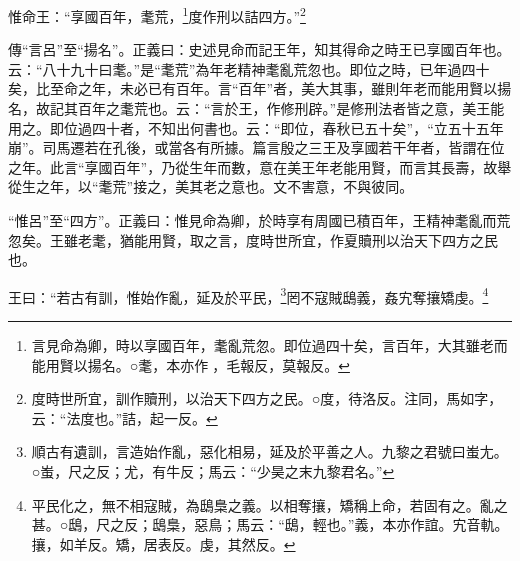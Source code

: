 惟命王：“享國百年，耄荒，\footnote{言見命為卿，時以享國百年，耄亂荒忽。即位過四十矣，言百年，大其雖老而能用賢以揚名。○耄，本亦作𦿗，毛報反，莫報反。}度作刑以詰四方。”\footnote{度時世所宜，訓作贖刑，以治天下四方之民。○度，待洛反。注同，馬如字，云：“法度也。”詰，起一反。}


{\noindent\zhuan{}\fzbyks 傳“言呂”至“揚名”。正義曰：史述見命而記王年，知其得命之時王已享國百年也。云：“八十九十曰耄。”是“耄荒”為年老精神耄亂荒忽也。即位之時，已年過四十矣，比至命之年，未必已有百年。言“百年”者，美大其事，雖則年老而能用賢以揚名，故記其百年之耄荒也。云：“言於王，作修刑辟。”是修刑法者皆之意，美王能用之。即位過四十者，不知出何書也。云：“即位，春秋已五十矣”，“立五十五年崩”。司馬遷若在孔後，或當各有所據。篇言殷之三王及享國若干年者，皆謂在位之年。此言“享國百年”，乃從生年而數，意在美王年老能用賢，而言其長壽，故舉從生之年，以“耄荒”接之，美其老之意也。文不害意，不與彼同。 \par}

{\noindent\shu{}\fzkt “惟呂”至“四方”。正義曰：惟見命為卿，於時享有周國已積百年，王精神耄亂而荒忽矣。王雖老耄，猶能用賢，取之言，度時世所宜，作夏贖刑以治天下四方之民也。 \par}

王曰：“若古有訓，惟始作亂，延及於平民，\footnote{順古有遺訓，言造始作亂，惡化相易，延及於平善之人。九黎之君號曰蚩尢。○蚩，尺之反；尤，有牛反；馬云：“少昊之末九黎君名。”}罔不寇賊鴟義，姦宄奪攘矯虔。\footnote{平民化之，無不相寇賊，為鴟梟之義。以相奪攘，矯稱上命，若固有之。亂之甚。○鴟，尺之反；鴟梟，惡鳥；馬云：“鴟，輕也。”義，本亦作誼。宄音軌。攘，如羊反。矯，居表反。虔，其然反。}


